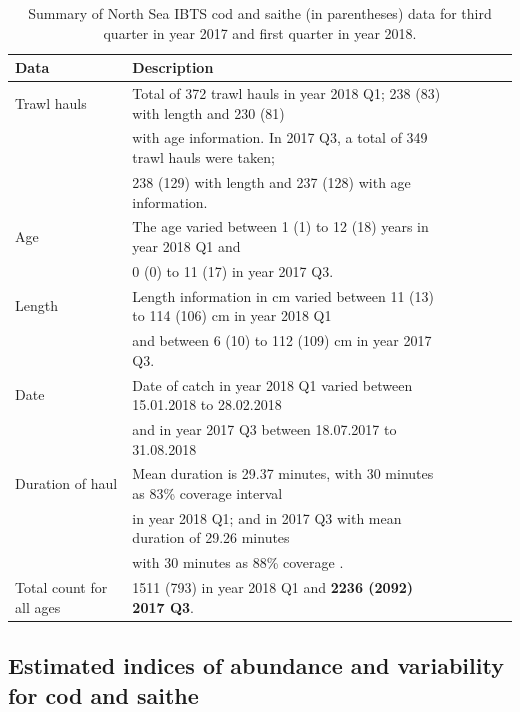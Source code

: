 \documentclass[a4paper 12pt]{article}
\numberwithin{equation}{section}
\begin{document}
\clearpage
\begin{small}
\begin{table}[h!]
\caption{Summary of North Sea IBTS cod and saithe (in parentheses) data for third quarter in year 2017 and first quarter in year 2018.}
\begin{tabular}{llllll}
\toprule
\bf Data&\bf Description \\
\midrule
Trawl hauls  & Total of 372 trawl hauls in year 2018 Q1; 238 (83)  with length and 230 (81) \\ & with age information. In 2017 Q3, a total of 349 trawl hauls were taken; \\ & 238 (129) with length and 237 (128) with age information. \\[1.7ex]

Age &The age varied between 1 (1) to 12 (18) years in year 2018 Q1 and \\ & 0 (0) to 11 (17) in year 2017 Q3. \\[1.7ex]

Length & Length information in cm varied between 11 (13) to 114 (106) cm in year 2018 Q1 \\ & and between 6 (10) to 112 (109) cm in year 2017 Q3. \\[1.7ex]

Date&Date of catch in year 2018 Q1 varied between 15.01.2018 to 28.02.2018 \\ & and in year 2017 Q3 between 18.07.2017 to 31.08.2018 \\[1.7ex]

Duration of haul & Mean duration is 29.37 minutes, with 30 minutes as 83\% coverage interval \\ & in year 2018 Q1; and in 2017 Q3 with mean duration of 29.26 minutes \\ & with 30 minutes as 88\% coverage . \\[1.7ex]

Total count for all ages & 1511 (793) in year 2018 Q1 and {\bf 2236 (2092) 2017 Q3}. \\[0.5ex]
\bottomrule
\end{tabular}
\label{tab:data2018}
\end{table}
\end{small}


\subsection{Estimated indices of abundance and variability for cod and saithe}
\label{sec:codresults}
\end{document}
